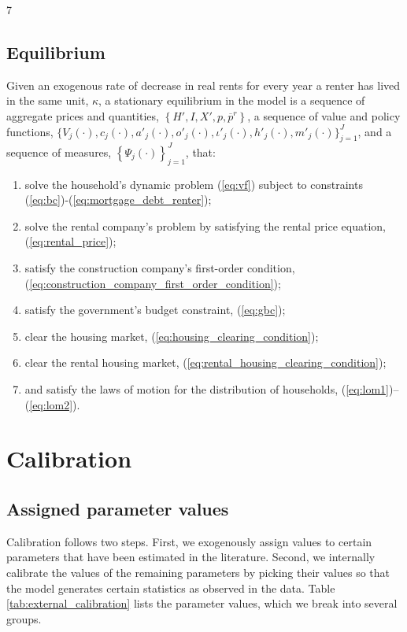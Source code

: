 7\documentclass[parskip=full]{article}
\begin{document}
\subsection{Equilibrium}
Given an exogenous rate of decrease in real rents for every year a renter has lived in the same unit, $\kappa$, a stationary equilibrium in the model is a sequence of aggregate prices and quantities, $\left\{H',I,X',p,\overline{p}^{r}\right\}$, a sequence of value and policy functions, $\biggl\{V_{j}(\cdot),c_{j}(\cdot),a'_{j}(\cdot),o'_{j}(\cdot),\iota'_{j}(\cdot),h'_{j}(\cdot),m'_{j}(\cdot)\biggl\}_{j=1}^J$, and a sequence of measures, $\left\{\Psi_{j}(\cdot)\right\}_{j=1}^J$, that:
\begin{enumerate}
\item solve the household's dynamic problem (\ref{eq:vf}) subject to constraints (\ref{eq:bc})-(\ref{eq:mortgage_debt_renter});
\item solve the rental company's problem by satisfying the rental price equation, (\ref{eq:rental_price});
\item satisfy the construction company's first-order condition, (\ref{eq:construction_company_first_order_condition});
\item satisfy the government's budget constraint, (\ref{eq:gbc});
\item clear the housing market,
(\ref{eq:housing_clearing_condition});
\item clear the rental housing market,
(\ref{eq:rental_housing_clearing_condition});
\item and satisfy the laws of motion for the distribution of households, (\ref{eq:lom1})--(\ref{eq:lom2}).
\end{enumerate}

\section{Calibration}

\subsection{Assigned parameter values}
Calibration follows two steps. First, we exogenously assign values to certain parameters that have been estimated in the literature. Second, we internally calibrate the values of the remaining parameters by picking their values so that the model generates certain statistics as observed in the data. Table \ref{tab:external_calibration} lists the parameter values, which we break into several groups.
\end{document}
